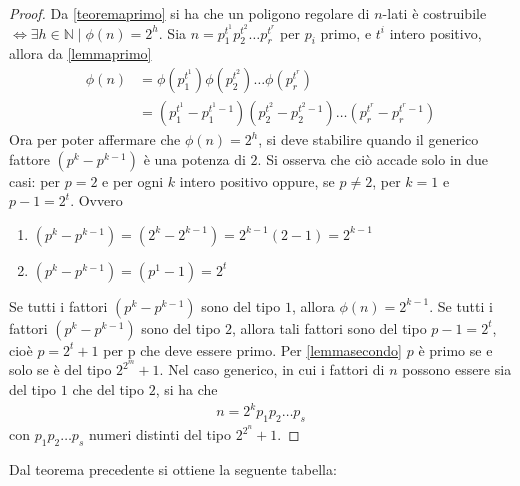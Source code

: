 \begin{proof}
Da \ref{teoremaprimo} si ha che un poligono regolare di $n$-lati è costruibile $\Leftrightarrow  \exists h \in \mathbb{N} \mid  \phi(n) = 2^h$. Sia $n = p_{1}^{t^1} p_{2}^{t^2} \dots p_{r}^{t^r}$ per $p_{i}$ primo, e $t^i$ intero positivo, allora da \ref{lemmaprimo}
\begin{align*} 
\phi(n) & = \phi(p_{1}^{t^1}) \phi( p_{2}^{t^2}) \dots \phi(p_{r}^{t^r}) \\
& = (p_{1}^{t^1} - p_{1}^{t^1 -1})(p_{2}^{t^2} - p_{2}^{t^2 -1}) \dots (p_{r}^{t^r} - p_{r}^{t^r -1})
\end{align*}
Ora per poter affermare che $\phi(n) = 2^h$, si deve stabilire quando il generico fattore $(p^{k} - p^{k -1})$ è una potenza di $2$. Si osserva che ciò accade solo in due casi: per $p = 2$ e per ogni $k$ intero positivo oppure, se $p \neq 2$, per $k = 1$ e $p - 1 = 2^t$. Ovvero 
\begin{enumerate}
\item $(p^{k} - p^{k -1}) = (2^{k} - 2^{k -1}) = 2^{k-1}(2-1) = 2^{k-1}$

\item $(p^{k} - p^{k -1}) = (p^{1} - 1) = 2^{t}$

\end{enumerate}

Se tutti i fattori $(p^{k} - p^{k -1})$ sono del tipo $1$, allora $\phi(n) = 2^{k-1}$.
Se tutti i fattori $(p^{k} - p^{k -1})$ sono del tipo $2$, allora tali fattori sono del tipo $p-1 = 2^t$, cioè $p = 2^t + 1$ per p che deve essere primo. Per  \ref{lemmasecondo} $p$ è primo se e solo se è del tipo $2^{2^m} + 1$.
Nel caso generico, in cui i fattori di $n$ possono essere sia del tipo $1$ che del tipo $2$, si ha che
\begin{align*} 
n = 2^k p_1 p_2 \dots p_s
\end{align*}
con $p_1 p_2 \dots p_s$ numeri distinti del tipo $2^{2^{n}} +1$.
\end{proof}

\noindent
Dal teorema precedente si ottiene la seguente tabella:

